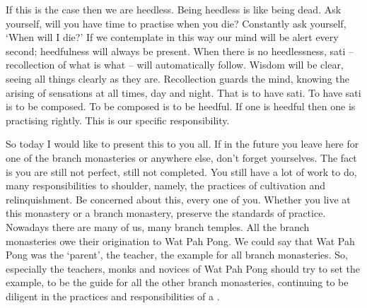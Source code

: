 If this is the case then we are heedless. Being heedless is like being dead. Ask yourself, will you have time to practise when you die? Constantly ask yourself, `When will I die?' If we contemplate in this way our mind will be alert every second; heedfulness will always be present. When there is no heedlessness, sati -- recollection of what is what -- will automatically follow. Wisdom will be clear, seeing all things clearly as they are. Recollection guards the mind, knowing the arising of sensations at all times, day and night. That is to have sati. To have sati is to be composed. To be composed is to be heedful. If one is heedful then one is practising rightly. This is our specific responsibility.

So today I would like to present this to you all. If in the future you leave here for one of the branch monasteries or anywhere else, don't forget yourselves. The fact is you are still not perfect, still not completed. You still have a lot of work to do, many responsibilities to shoulder, namely, the practices of cultivation and relinquishment. Be concerned about this, every one of you. Whether you live at this monastery or a branch monastery, preserve the standards of practice. Nowadays there are many of us, many branch temples. All the branch monasteries owe their origination to Wat Pah Pong. We could say that Wat Pah Pong was the `parent', the teacher, the example for all branch monasteries. So, especially the teachers, monks and novices of Wat Pah Pong should try to set the example, to be the guide for all the other branch monasteries, continuing to be diligent in the practices and responsibilities of a .

